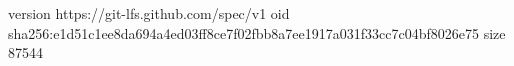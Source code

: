 version https://git-lfs.github.com/spec/v1
oid sha256:e1d51c1ee8da694a4ed03ff8ce7f02fbb8a7ee1917a031f33cc7c04bf8026e75
size 87544
